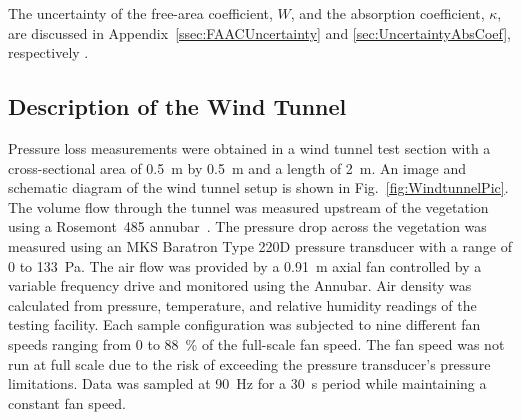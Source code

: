 \documentclass[12pt]{article}
\begin{document}
The uncertainty of the free-area coefficient, $W$, and the absorption coefficient, $\kappa$, are discussed in Appendix~\ref{ssec:FAACUncertainty} and \ref{sec:UncertaintyAbsCoef}, respectively .

\subsection{Description of the Wind Tunnel}
\label{ssec:DescirptionofWind}

Pressure loss measurements were obtained in a wind tunnel test section with a cross-sectional area of 0.5~\si{m} by 0.5~\si{m} and a length of 2~\si{m}. An image and schematic diagram of the wind tunnel setup is shown in Fig.~\ref{fig:WindtunnelPic}. The volume flow through the tunnel was measured upstream of the vegetation using a Rosemont~485 annubar~\cite{Annubar}. The pressure drop across the vegetation was measured using an MKS Baratron Type 220D pressure transducer with a range of 0 to 133~Pa. The air flow was provided by a 0.91~m axial fan controlled by a variable frequency drive and monitored using the Annubar. Air density was calculated from pressure, temperature, and relative humidity readings of the testing facility. Each sample configuration was subjected to nine different fan speeds ranging from 0 to 88~\% of the full-scale fan speed. The fan speed was not run at full scale due to the risk of exceeding the pressure transducer's pressure limitations. Data was sampled at 90~\si{Hz} for a 30~\si{s} period while maintaining a constant fan speed. 
\end{document}
